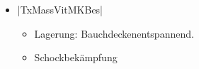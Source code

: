 \label{m:eileiterschwangerschaft-rupturiert}
\begin{itemize}
  \item |TxMassVitMKBes|
  \begin{itemize}
    \item Lagerung: Bauchdeckenentspannend.
    \item Schockbekämpfung
  \end{itemize}
\end{itemize}